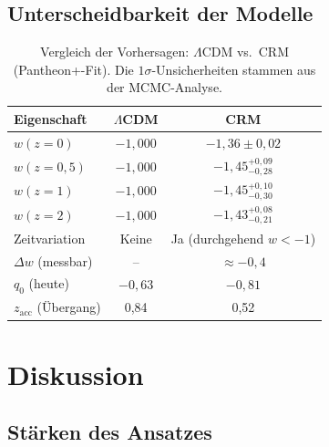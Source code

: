 \documentclass[aps,prd,twocolumn,superscriptaddress,nofootinbib]{revtex4-2}
\begin{document}
\subsection{Unterscheidbarkeit der Modelle}

\begin{table}[H]
\centering
\caption{Vergleich der Vorhersagen: $\Lambda$CDM vs.\ CRM (Pantheon+-Fit). Die $1\sigma$-Unsicherheiten stammen aus der MCMC-Analyse.}
\label{tab:vorhersagen}
\begin{tabular}{lcc}
\toprule
\textbf{Eigenschaft} & $\Lambda$CDM & CRM \\
\midrule
$w(z{=}0)$ & $-1{,}000$ & $-1{,}36 \pm 0{,}02$ \\
$w(z{=}0{,}5)$ & $-1{,}000$ & $-1{,}45^{+0{,}09}_{-0{,}28}$ \\
$w(z{=}1)$ & $-1{,}000$ & $-1{,}45^{+0{,}10}_{-0{,}30}$ \\
$w(z{=}2)$ & $-1{,}000$ & $-1{,}43^{+0{,}08}_{-0{,}21}$ \\
Zeitvariation & Keine & Ja (durchgehend $w < -1$) \\
$\Delta w$ (messbar) & -- & $\approx -0{,}4$ \\
$q_0$ (heute) & $-0{,}63$ & $-0{,}81$ \\
$z_{\mathrm{acc}}$ (\"Ubergang) & 0,84 & 0,52 \\
\bottomrule
\end{tabular}
\end{table}

\section{Diskussion}
\label{sec:diskussion}

\subsection{St\"arken des Ansatzes}
\end{document}
